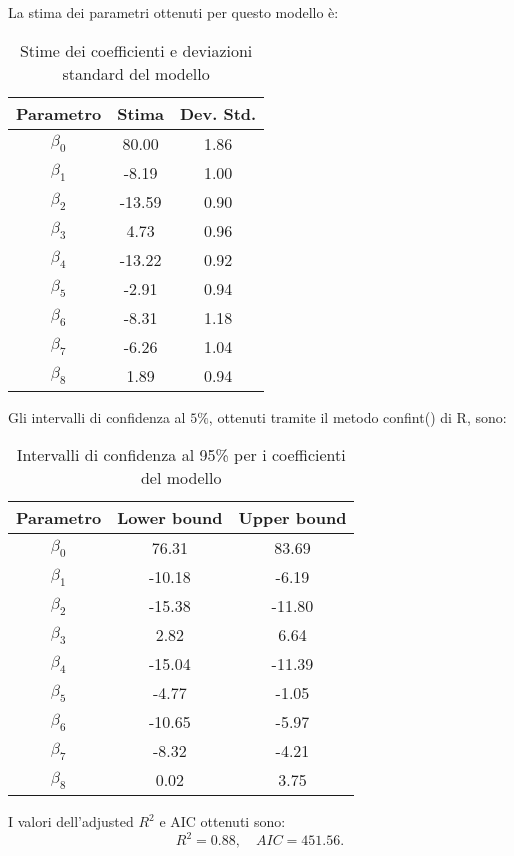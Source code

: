 La stima dei parametri ottenuti per questo modello è:
\begin{table}[H]
	\centering
	\begin{tabular}{|c|c|c|}
		\hline
		\textbf{Parametro} & \textbf{Stima} & \textbf{Dev. Std.} \\
		\hline
		$\beta_0$   & 80.00  & 1.86 \\
		$\beta_1$   & -8.19  & 1.00 \\
		$\beta_2$   & -13.59 & 0.90 \\
		$\beta_3$   & 4.73   & 0.96 \\
		$\beta_4$   & -13.22  & 0.92 \\
		$\beta_5$   & -2.91 & 0.94 \\
		$\beta_6$   & -8.31   & 1.18 \\
		$\beta_7$   & -6.26  & 1.04 \\
		$\beta_8$   & 1.89  & 0.94 \\
		\hline
	\end{tabular}
	\caption{Stime dei coefficienti e deviazioni standard del modello}
	\label{tab:stima_coef_std}
\end{table}
Gli intervalli di confidenza al $5\%$, ottenuti tramite il metodo confint() di R, sono:
\begin{table}[H]
	\centering
	\begin{tabular}{|c|c|c|}
		\hline
		\textbf{Parametro} & \textbf{Lower bound} & \textbf{Upper bound} \\
		\hline
		$\beta_0$   & 76.31  & 83.69 \\
		$\beta_1$   & -10.18 & -6.19 \\
		$\beta_2$   & -15.38 & -11.80 \\
		$\beta_3$   & 2.82   & 6.64 \\
		$\beta_4$   & -15.04  & -11.39 \\
		$\beta_5$   & -4.77 & -1.05 \\
		$\beta_6$   & -10.65  & -5.97 \\
		$\beta_7$   & -8.32  & -4.21 \\
		$\beta_8$   & 0.02 & 3.75 \\
		\hline
	\end{tabular}
	\caption{Intervalli di confidenza al 95\% per i coefficienti del modello}
	\label{tab:ci_coefficienti}
\end{table}
I valori dell'adjusted $R^2$  e AIC ottenuti sono:
\begin{equation*}
	R^2 =      0.88, \quad AIC=451.56.
\end{equation*}


